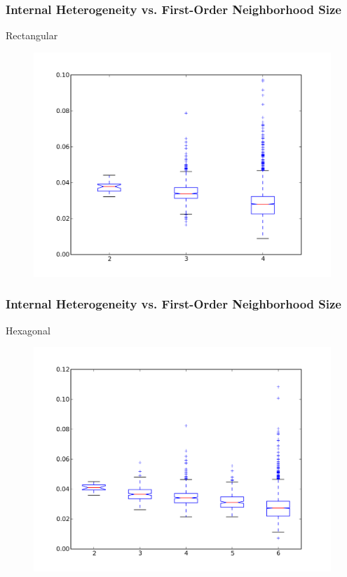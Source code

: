 \documentclass[nototal,handout]{beamer}
\begin{document}
\begin{frame}
	\frametitle{Internal Heterogeneity vs. First-Order Neighborhood Size}
 
\begin{block}{Rectangular}
  \begin{center}
  \begin{figure}
  \includegraphics[width=0.75\linewidth]{rook_iv_box.png}
  \end{figure}
  \end{center}
 \end{block} \end{frame} 

\begin{frame}
	\frametitle{Internal Heterogeneity vs. First-Order Neighborhood Size}
 
\begin{block}{Hexagonal}
  \begin{center}
  \begin{figure}
  \includegraphics[width=0.75\linewidth]{hex_iv_box.png}
  \end{figure}
  \end{center}
 \end{block} \end{frame} 
\end{document}
